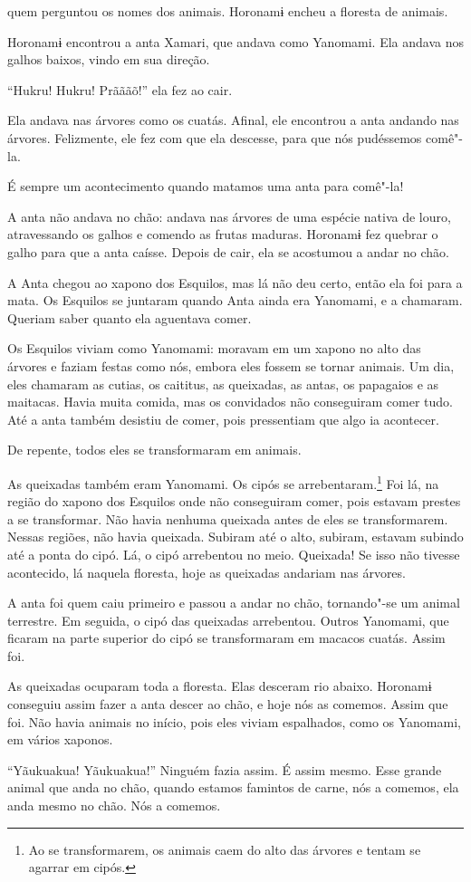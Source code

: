 
 

 

 quem perguntou os nomes dos animais. Horonamɨ encheu a
floresta de animais. 

Horonamɨ encontrou a anta Xamari, que andava como Yanomami. Ela andava
nos galhos baixos, vindo em sua direção. 

``Hukru! Hukru! Prãããõ!'' ela fez ao cair. 

Ela andava nas árvores como os cuatás. Afinal, ele encontrou a anta
andando nas árvores. Felizmente, ele fez com que ela descesse, para que
nós pudéssemos comê"-la. 

É sempre um acontecimento quando matamos uma anta para comê"-la! 

A anta não andava no chão: andava nas árvores de uma espécie nativa de
louro, atravessando os galhos e comendo as frutas maduras. Horonamɨ fez
quebrar o galho para que a anta caísse. Depois de cair, ela se acostumou
a andar no chão. 

A Anta chegou ao xapono dos Esquilos, mas lá não deu certo, então ela
foi para a mata. Os Esquilos se juntaram quando Anta ainda era Yanomami,
e a chamaram. Queriam saber quanto ela aguentava comer.

Os Esquilos viviam como Yanomami: moravam em um xapono no alto das
árvores e faziam festas como nós, embora eles fossem se tornar animais.
Um dia, eles chamaram as cutias, os caititus, as queixadas, as antas, os
papagaios e as maitacas. Havia muita comida, mas os convidados não
conseguiram comer tudo. Até a anta também desistiu de comer, pois
pressentiam que algo ia acontecer. 

De repente, todos eles se transformaram em animais. 

As queixadas também eram Yanomami. Os cipós se
arrebentaram.\footnote{   Ao se transformarem, os animais caem do alto das árvores e tentam se
agarrar em cipós.}  Foi lá, na região do xapono dos Esquilos
onde não conseguiram comer, pois estavam prestes a se transformar. Não
havia nenhuma queixada antes de eles se transformarem. Nessas regiões,
não havia queixada. Subiram até o alto, subiram, estavam subindo até a
ponta do cipó. Lá, o cipó arrebentou no meio. Queixada! Se isso não
tivesse acontecido, lá naquela floresta, hoje as queixadas andariam nas
árvores. 

A anta foi quem caiu primeiro e passou a andar no chão, tornando"-se um
animal terrestre. Em seguida, o cipó das queixadas arrebentou. Outros
Yanomami, que ficaram na parte superior do cipó se transformaram em
macacos cuatás. Assim foi. 

As queixadas ocuparam toda a floresta. Elas desceram rio abaixo.
Horonamɨ conseguiu assim fazer a anta descer ao chão, e hoje nós as
comemos. Assim que foi. Não havia animais no início, pois eles viviam
espalhados, como os Yanomami, em vários xaponos. 

``Yãukuakua! Yãukuakua!'' Ninguém fazia assim. É assim mesmo. Esse
grande animal que anda no chão, quando estamos famintos de carne, nós a
comemos, ela anda mesmo no chão. Nós a comemos. 

 
